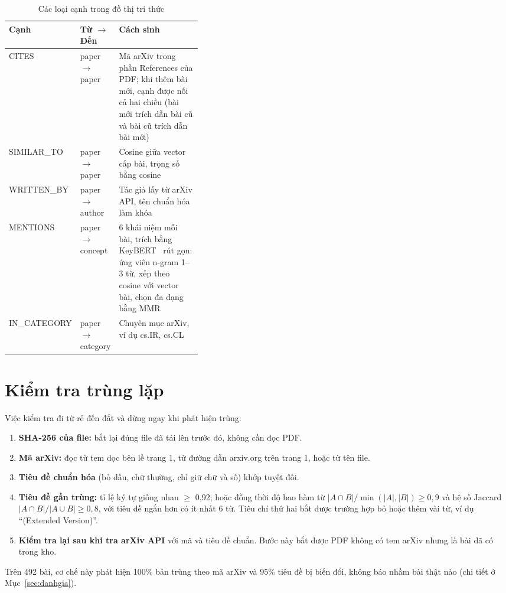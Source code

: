 \begin{table}[H]
\centering\small{}
\begin{tabularx}{\linewidth}{@{}P{0.18\linewidth}P{0.2\linewidth}L@{}}
\toprule
\textbf{Cạnh} & \textbf{Từ $\to$ Đến} & \textbf{Cách sinh}\\
\midrule
CITES & paper $\to$ paper & Mã arXiv trong phần References của PDF; khi thêm bài mới, cạnh được nối cả hai chiều (bài mới trích dẫn bài cũ và bài cũ trích dẫn bài mới)\\
SIMILAR\_TO & paper $\to$ paper & Cosine giữa vector cấp bài, trọng số bằng cosine\\
WRITTEN\_BY & paper $\to$ author & Tác giả lấy từ arXiv API, tên chuẩn hóa làm khóa\\
MENTIONS & paper $\to$ concept & 6 khái niệm mỗi bài, trích bằng KeyBERT~\cite{keybert} rút gọn: ứng viên n-gram 1--3 từ, xếp theo cosine với vector bài, chọn đa dạng bằng MMR~\cite{mmr}\\
IN\_CATEGORY & paper $\to$ category & Chuyên mục arXiv, ví dụ cs.IR, cs.CL\\
\bottomrule
\end{tabularx}
\caption{Các loại cạnh trong đồ thị tri thức}\label{tab:canh}
\end{table}

\section{Kiểm tra trùng lặp}\label{sec:dedup}

Việc kiểm tra đi từ rẻ đến đắt và dừng ngay khi phát hiện trùng:

\begin{enumerate}[label=(\arabic*)]
\item \textbf{SHA-256 của file:} bắt lại đúng file đã tải lên trước đó, không cần đọc PDF.
\item \textbf{Mã arXiv:} đọc từ tem dọc bên lề trang 1, từ đường dẫn arxiv.org trên trang 1, hoặc từ tên file.
\item \textbf{Tiêu đề chuẩn hóa} (bỏ dấu, chữ thường, chỉ giữ chữ và số) khớp tuyệt đối.
\item \textbf{Tiêu đề gần trùng:} tỉ lệ ký tự giống nhau $\geq$ 0,92; hoặc đồng thời độ bao hàm từ
  $|A\cap B|/\min(|A|,|B|) \geq 0{,}9$ và hệ số Jaccard $|A\cap B|/|A\cup B| \geq 0{,}8$, với tiêu đề ngắn hơn có ít
  nhất 6 từ. Tiêu chí thứ hai bắt được trường hợp bỏ hoặc thêm vài từ, ví dụ ``(Extended Version)''.
\item \textbf{Kiểm tra lại sau khi tra arXiv API} với mã và tiêu đề chuẩn. Bước này bắt được PDF không có tem arXiv
  nhưng là bài đã có trong kho.
\end{enumerate}

Trên 492 bài, cơ chế này phát hiện 100\% bản trùng theo mã arXiv và 95\% tiêu đề bị biến đổi, không báo nhầm bài
thật nào (chi tiết ở Mục~\ref{sec:danhgia}).
